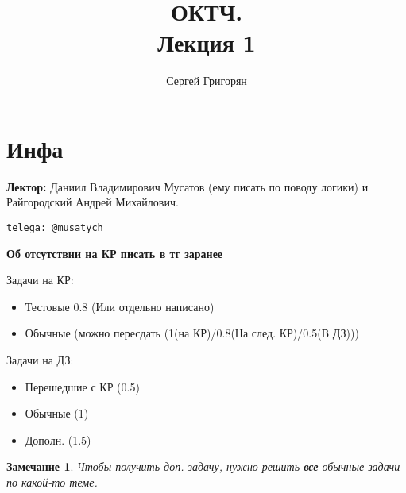 \documentclass[12pt]{article}
\title{ОКТЧ. \\ Лекция 1}
\author{Сергей Григорян}
\newtheorem*{note}{\underline{Замечание}}
\theoremstyle{definition}
\theoremstyle{definition}
\begin{document}
\maketitle
\newpage
\section{Инфа}
\textbf{Лектор:} Даниил Владимирович Мусатов (ему писать по поводу логики) и Райгородский Андрей Михайлович.
\begin{verbatim}
telega: @musatych
\end{verbatim}
\textbf{Об отсутствии на КР писать в тг заранее}

Задачи на КР:
\begin{itemize}
    \item Тестовые 0.8 (Или отдельно написано)
    \item Обычные (можно пересдать (1(на КР)/0.8(На след. КР)/0.5(В ДЗ)))
\end{itemize}

Задачи на ДЗ:
\begin{itemize}
    \item Перешедшие с КР (0.5)
    \item Обычные (1)
    \item Дополн. (1.5)
\end{itemize}
\begin{note}
Чтобы получить доп. задачу, нужно решить \textbf{все} обычные задачи по какой-то теме.
\end{note}
\end{document}
